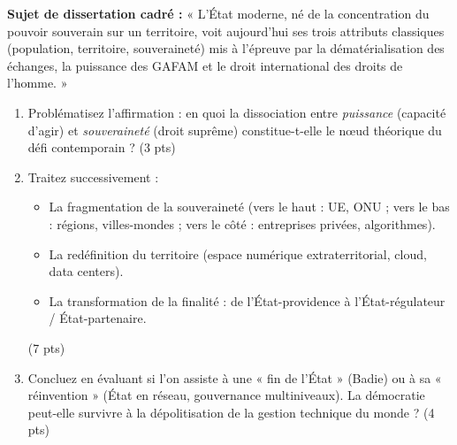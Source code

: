 \documentclass[11pt]{article}
\begin{document}
\begin{exercice}
\textbf{Sujet de dissertation cadré :} « L'État moderne, né de la concentration du pouvoir souverain sur un territoire, voit aujourd'hui ses trois attributs classiques (population, territoire, souveraineté) mis à l'épreuve par la dématérialisation des échanges, la puissance des GAFAM et le droit international des droits de l'homme. »
\begin{enumerate}
    \item Problématisez l'affirmation : en quoi la dissociation entre \textit{puissance} (capacité d'agir) et \textit{souveraineté} (droit suprême) constitue-t-elle le nœud théorique du défi contemporain ? (3 pts)
    \item Traitez successivement : 
    \begin{itemize}
        \item La fragmentation de la souveraineté (vers le haut : UE, ONU ; vers le bas : régions, villes-mondes ; vers le côté : entreprises privées, algorithmes).
        \item La redéfinition du territoire (espace numérique extraterritorial, cloud, data centers).
        \item La transformation de la finalité : de l'État-providence à l'État-régulateur / État-partenaire.
    \end{itemize}
    (7 pts)
    \item Concluez en évaluant si l'on assiste à une « fin de l'État » (Badie) ou à sa « réinvention » (État en réseau, gouvernance multiniveaux). La démocratie peut-elle survivre à la dépolitisation de la gestion technique du monde ? (4 pts)
\end{enumerate}
\end{exercice}
\end{document}
